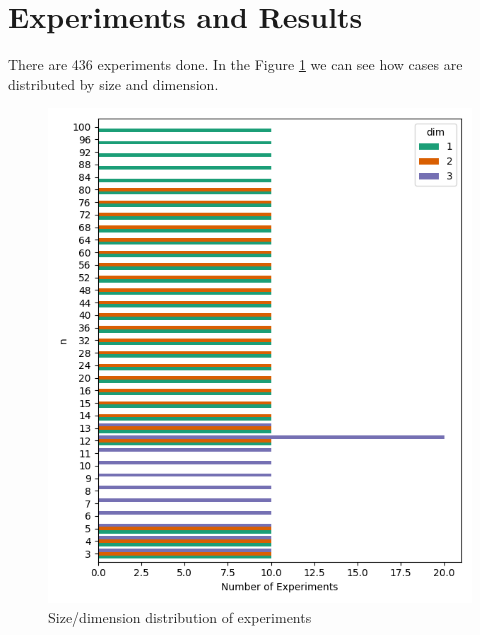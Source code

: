 \documentclass{article}
\begin{document}
\section{Experiments and Results}
\par There are 436 experiments done. In the Figure \ref{fig:cases_distribution} we can see how cases are distributed by size and dimension.
\begin{figure}[ht]
  \centering
  \includegraphics[width=\textwidth]{pics/torus scores/cases.png}
  \caption{Size/dimension distribution of experiments}
  \label{fig:cases_distribution}
\end{figure}
\end{document}
